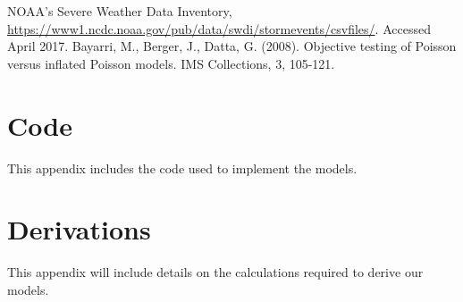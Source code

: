 \documentclass{article}
\begin{document}
\begin{thebibliography}{1}
   NOAA's Severe Weather Data Inventory, 
    \url{https://www1.ncdc.noaa.gov/pub/data/swdi/stormevents/csvfiles/}. 
    Accessed April 2017.
    Bayarri, M., Berger, J., Datta, G. (2008). Objective testing of Poisson versus inflated Poisson models. IMS 	Collections, 3, 105-121. 
\end{thebibliography}
\clearpage
\appendix
\section{Code}
\label{a:code}
This appendix includes the code used to implement the models.

\section{Derivations}
\label{a:derivation}
This appendix will include details on the calculations required to derive our models.
\end{document}
